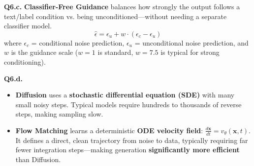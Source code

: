 \documentclass[11pt]{article}
\begin{document}
\vspace{0.75em}
\textbf{Q6.c.} \textbf{Classifier-Free Guidance} balances how strongly the output follows a text/label condition vs. being unconditioned—without needing a separate classifier model.
$$\hat{\epsilon} = \epsilon_u + w\!\cdot\!(\epsilon_c - \epsilon_u)$$
where $\epsilon_c$ = conditional noise prediction, $\epsilon_u$ = unconditional noise prediction, and $w$ is the guidance scale ($w=1$ is standard, $w=7.5$ is typical for strong conditioning).

\vspace{0.75em}
\textbf{Q6.d.}
\begin{itemize}[leftmargin=2em, nosep]
\item \textbf{Diffusion} uses a \textbf{stochastic differential equation (SDE)} with many small noisy steps. Typical models require hundreds to thousands of reverse steps, making sampling slow.
\item \textbf{Flow Matching} learns a deterministic \textbf{ODE velocity field}: $\frac{d\mathbf{x}}{dt} = v_\theta(\mathbf{x}, t)$. It defines a direct, clean trajectory from noise to data, typically requiring far fewer integration steps—making generation \textbf{significantly more efficient} than Diffusion.
\end{itemize}
\end{document}
